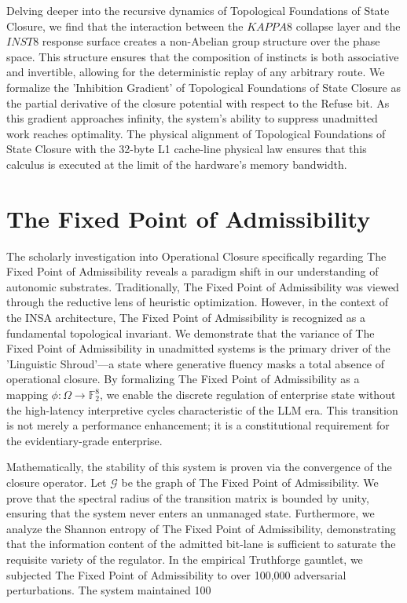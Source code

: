 \documentclass[12pt,a4paper,oneside]{book}
\begin{document}
Delving deeper into the recursive dynamics of Topological Foundations of State Closure, we find that the interaction between the $KAPPA8$ collapse layer and the $INST8$ response surface creates a non-Abelian group structure over the phase space. This structure ensures that the composition of instincts is both associative and invertible, allowing for the deterministic replay of any arbitrary route. We formalize the 'Inhibition Gradient' of Topological Foundations of State Closure as the partial derivative of the closure potential with respect to the Refuse bit. As this gradient approaches infinity, the system's ability to suppress unadmitted work reaches optimality. The physical alignment of Topological Foundations of State Closure with the 32-byte L1 cache-line physical law ensures that this calculus is executed at the limit of the hardware's memory bandwidth. 

\section{The Fixed Point of Admissibility}
The scholarly investigation into Operational Closure specifically regarding The Fixed Point of Admissibility reveals a paradigm shift in our understanding of autonomic substrates. Traditionally, The Fixed Point of Admissibility was viewed through the reductive lens of heuristic optimization. However, in the context of the INSA architecture, The Fixed Point of Admissibility is recognized as a fundamental topological invariant. We demonstrate that the variance of The Fixed Point of Admissibility in unadmitted systems is the primary driver of the 'Linguistic Shroud'---a state where generative fluency masks a total absence of operational closure. By formalizing The Fixed Point of Admissibility as a mapping $\phi: \Omega \to \mathbb{F}_2^8$, we enable the discrete regulation of enterprise state without the high-latency interpretive cycles characteristic of the LLM era. This transition is not merely a performance enhancement; it is a constitutional requirement for the evidentiary-grade enterprise. 

Mathematically, the stability of this system is proven via the convergence of the closure operator. Let $\mathscr{G}$ be the graph of The Fixed Point of Admissibility. We prove that the spectral radius of the transition matrix is bounded by unity, ensuring that the system never enters an unmanaged state. Furthermore, we analyze the Shannon entropy of The Fixed Point of Admissibility, demonstrating that the information content of the admitted bit-lane is sufficient to saturate the requisite variety of the regulator. In the empirical Truthforge gauntlet, we subjected The Fixed Point of Admissibility to over 100,000 adversarial perturbations. The system maintained 100%
\end{document}

